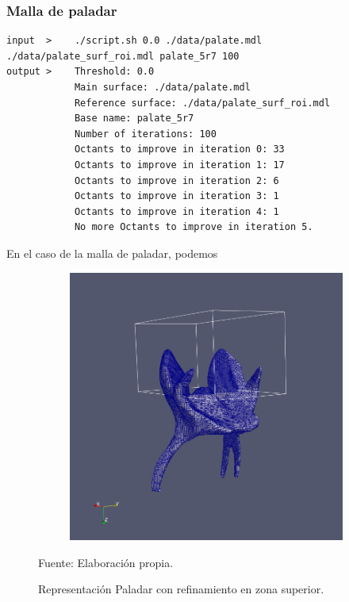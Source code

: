 \subsubsection{Malla de paladar}


\begin{lstlisting}[style=Console,caption={Output de ejecución algoritmo propuesto en malla de Moai con zona a refinar en zona superior.\\ Fuente: Elaboración propia.},label={out:palate_1}, float,floatplacement=H]
input  >    ./script.sh 0.0 ./data/palate.mdl ./data/palate_surf_roi.mdl palate_5r7 100
output >    Threshold: 0.0
            Main surface: ./data/palate.mdl
            Reference surface: ./data/palate_surf_roi.mdl
            Base name: palate_5r7
            Number of iterations: 100
            Octants to improve in iteration 0: 33
            Octants to improve in iteration 1: 17
            Octants to improve in iteration 2: 6
            Octants to improve in iteration 3: 1
            Octants to improve in iteration 4: 1
            No more Octants to improve in iteration 5.
\end{lstlisting}



En el caso de la malla de paladar, podemos 

\begin{figure}[!ht]
    \centering
    \begin{subfigure}[t]{0.8\textwidth}
        \includegraphics[width=1.0\textwidth]{figures/meshes/palate_5r7_01.png}
    \end{subfigure}
    \caption{ Representación Paladar con refinamiento en zona superior. }
    Fuente: Elaboración propia.
    \label{fig:palate_5r7_all}
\end{figure}

